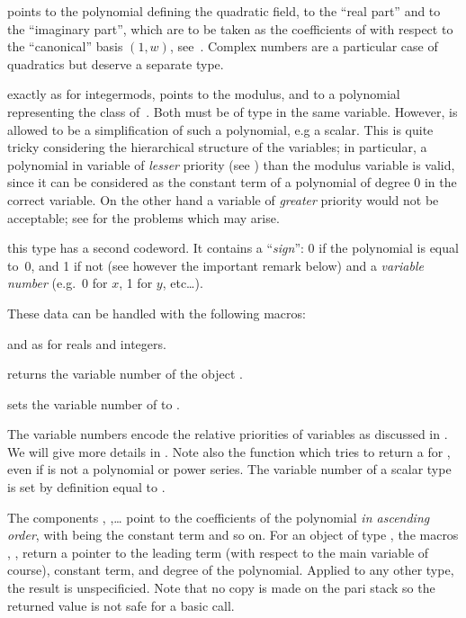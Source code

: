   points to the polynomial defining the
quadratic field,  to the ``real part'' and  to the
``imaginary part'', which are to be taken as the coefficients of 
with respect to the ``canonical'' basis $(1,w)$, see~.
Complex numbers are a particular case of quadratics but deserve a separate
type.

 exactly as
for integermods,  points to the modulus, and  to a
polynomial representing the class of~. Both must be of type
 in the same variable. However,  is allowed to be a
simplification of such a polynomial, e.g a scalar. This is quite tricky
considering the hierarchical structure of the variables; in particular, a
polynomial in variable of \emph{lesser} priority (see )
than the modulus variable is valid, since it can be considered as the
constant term of a polynomial of degree 0 in the correct variable. On the
other hand a variable of \emph{greater} priority would not be acceptable;
see  for the problems which may arise.

 this
type has a second codeword. It contains a ``\emph{sign}'': 0 if the
polynomial is equal to~0, and 1 if not (see however the important remark
below) and a \emph{variable number} (e.g.~0 for $x$, 1 for $y$, etc\dots).

\noindent These data can be handled with the following macros:

 and  as for reals and integers.

 returns the variable number of the object .

 sets the variable number of  to
.

The variable numbers encode the relative priorities of variables as discussed
in . We will give more details in . Note
also the function  which tries to return a
 for , even if  is not a polynomial or
power series. The variable number of a scalar type is set by definition equal
to .

The components , ,\dots {} point to the
coefficients of the polynomial \emph{in ascending order}, with 
being the constant term and so on. For an object of type ,
the macros , , 
return a pointer to the leading term (with respect to the main variable of
course), constant term, and degree of the polynomial. Applied to any other
type, the result is unspecificied. Note that no copy is made on the pari
stack so the returned value is not safe for a basic  call.

